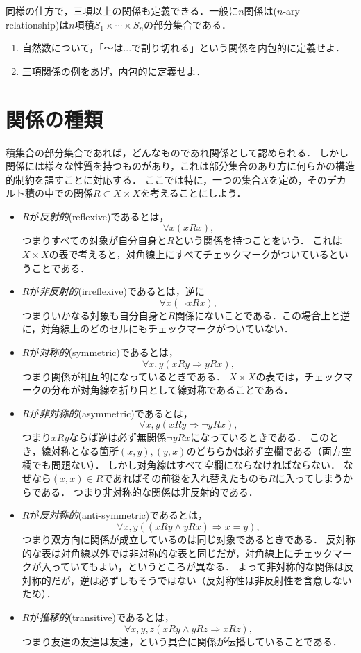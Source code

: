 \documentclass[11pt,a4paper]{bxjsarticle}
\begin{document}
同様の仕方で，三項以上の関係も定義できる．一般に$n$関係は($n$-ary relationship)は$n$項積$S_1 \times \cdots \times S_n$の部分集合である．

\begin{renshu}{}{}
\begin{enumerate}
 \item 自然数について，「〜は...で割り切れる」という関係を内包的に定義せよ．
 \item 三項関係の例をあげ，内包的に定義せよ．
\end{enumerate}
\end{renshu}


\section{関係の種類}
\label{sec:relation_kinds}
積集合の部分集合であれば，どんなものであれ関係として認められる．
しかし関係には様々な性質を持つものがあり，これは部分集合のあり方に何らかの構造的制約を課すことに対応する．
ここでは特に，一つの集合$X$を定め，そのデカルト積の中での関係$R \subset X \times X$を考えることにしよう．

\begin{itemize}
 \item $R$が\emph{反射的}(reflexive)であるとは，
       \[ \forall x ( xRx ), \]
       つまりすべての対象が自分自身と$R$という関係を持つことをいう．
       これは$X \times X$の表で考えると，対角線上にすべてチェックマークがついているということである．
 \item $R$が\emph{非反射的}(irreflexive)であるとは，逆に
       \[ \forall x ( \neg xRx ), \]
       つまりいかなる対象も自分自身と$R$関係にないことである．この場合上と逆に，対角線上のどのセルにもチェックマークがついていない．
 \item $R$が\emph{対称的}(symmetric)であるとは，
       \[ \forall x, y ( xRy \Rightarrow yRx ), \]
       つまり関係が相互的になっているときである．
       $X \times X$の表では，チェックマークの分布が対角線を折り目として線対称であることである．
 \item $R$が\emph{非対称的}(asymmetric)であるとは，
       \[  \forall x, y ( xRy \Rightarrow \neg yRx ), \]
       つまり$xRy$ならば逆は必ず無関係$\neg yRx$になっているときである．
       このとき，線対称となる箇所$(x,y), (y,x)$のどちらかは必ず空欄である（両方空欄でも問題ない）．
       しかし対角線はすべて空欄にならなければならない．
       なぜなら$(x,x) \in R$であればその前後を入れ替えたものも$R$に入ってしまうからである．
       つまり非対称的な関係は非反射的である．
 \item $R$が\emph{反対称的}(anti-symmetric)であるとは，
       \[ \forall x, y (( xRy \wedge yRx)  \Rightarrow x=y), \]
       つまり双方向に関係が成立しているのは同じ対象であるときである．
       反対称的な表は対角線以外では非対称的な表と同じだが，対角線上にチェックマークが入っていてもよい，というところが異なる．
       よって非対称的な関係は反対称的だが，逆は必ずしもそうではない（反対称性は非反射性を含意しないため）．
 \item $R$が\emph{推移的}(transitive)であるとは，
       \[ \forall x, y, z  ( xRy \wedge yRz \Rightarrow xRz), \]
       つまり友達の友達は友達，という具合に関係が伝播していることである．
\end{itemize}
\end{document}
